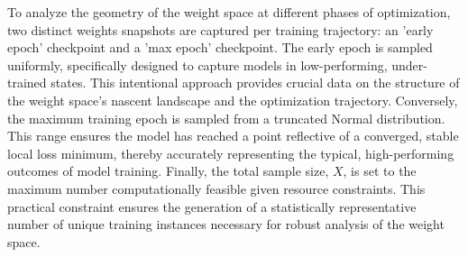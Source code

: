 To analyze the geometry of the weight space at different phases of optimization, two distinct weights snapshots are captured per training trajectory: an 'early epoch' checkpoint and a 'max epoch' checkpoint. The early epoch is sampled uniformly, specifically designed to capture models in low-performing, under-trained states. This intentional approach provides crucial data on the structure of the weight space's nascent landscape and the optimization trajectory. Conversely, the maximum training epoch is sampled from a truncated Normal distribution. This range ensures the model has reached a point reflective of a converged, stable local loss minimum, thereby accurately representing the typical, high-performing outcomes of model training. Finally, the total sample size, $X$, is set to the maximum number computationally feasible given resource constraints. This practical constraint ensures the generation of a statistically representative number of unique training instances necessary for robust analysis of the weight space.




\newpage
